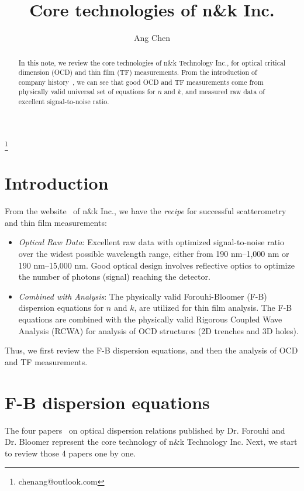 \documentclass[pra,superscriptaddress,reprint]{revtex4-1}
\begin{document}
\title{\Large Core technologies of n\&k Inc.}

\author{Ang Chen}
\thanks{chenang@outlook.com}


\begin{abstract}
In this note, we review the core technologies of n\&k Technology Inc., 
for optical critical dimension (OCD) and thin film (TF) measurements.
From the introduction of company history~\cite{nkhistory}, we can see that good OCD and TF measurements come from
physically valid universal set of equations for $n$ and $k$, and measured raw data of excellent signal-to-noise ratio.
\end{abstract}

\maketitle


\section{Introduction~\label{sec:1}}
From the website~\cite{nkpremise} of n\&k Inc., we have the \textit{recipe} for successful 
scatterometry and thin film measurements:
\begin{itemize}%
\setlength{\itemsep}{2pt}
\setlength{\parsep}{0pt}
\setlength{\parskip}{0pt}
\item \textit{Optical Raw Data}: Excellent raw data with optimized signal-to-noise ratio over the widest possible wavelength range, 
either from 190 nm--1,000 nm or 190 nm--15,000 nm. Good optical design involves reflective optics to optimize the number of photons (signal) reaching the detector.
\item \textit{Combined with Analysis}: The physically valid Forouhi-Bloomer (F-B) dispersion equations for $n$ and $k$, are utilized for thin film analysis.
The F-B equations are combined with the physically valid Rigorous Coupled Wave Analysis (RCWA) for analysis of OCD structures (2D trenches and 3D holes).
\end{itemize}

Thus, we first review the F-B dispersion equations, and then the analysis of OCD and TF measurements.  

\section{F-B dispersion equations}
The four papers~\cite{forouhi1986optical,forouhi1988optical,forouhi2019new,forouhi2021optical} on optical dispersion relations 
published by Dr. Forouhi and Dr. Bloomer represent the core technology of n\&k Technology Inc.
Next, we start to review those 4 papers one by one.
\end{document}

